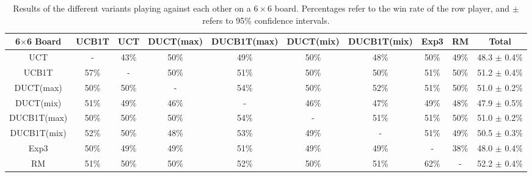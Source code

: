 \documentclass{article}
\begin{document}
\begin{table}[h!]\scriptsize
\centering
\begin{tabular}{|c||c|c|c|c|c|c|c|c||c|}
									\hline
	6$\times$6 Board	& UCB1T 	& UCT		& DUCT(max)	& DUCB1T(max)	& DUCT(mix)	& DUCB1T(mix)	& Exp3 & RM & Total \\ \hline
   UCT &    - & 43\% & 50\% & 49\% & 50\% & 48\% & 50\% & 49\%       & 48.3 $\pm$ 0.4\% \\ \hline 
 UCB1T & 57\% &    - & 50\% & 51\% & 50\% & 50\% & 51\% & 50\%       & 51.2 $\pm$ 0.4\% \\ \hline 
   DUCT(max) & 50\% & 50\% &    - & 54\% & 50\% & 52\% & 51\% & 50\% & 51.0 $\pm$ 0.2\% \\ \hline 
   DUCT(mix) & 51\% & 49\% & 46\% &    - & 46\% & 47\% & 49\% & 48\% & 47.9 $\pm$ 0.5\% \\ \hline 
 DUCB1T(max) & 50\% & 50\% & 50\% & 54\% &    - & 51\% & 51\% & 50\% & 51.0 $\pm$ 0.2\% \\ \hline 
 DUCB1T(mix) & 52\% & 50\% & 48\% & 53\% & 49\% &    - & 51\% & 49\% & 50.5 $\pm$ 0.3\% \\ \hline 
      Exp3 & 50\% & 49\% & 49\% & 51\% & 49\% & 49\% &    - & 38\%   & 48.0 $\pm$ 0.4\% \\ \hline 
        RM & 51\% & 50\% & 50\% & 52\% & 50\% & 51\% & 62\% &    -   & 52.2 $\pm$ 0.4\% \\ \hline 
\end{tabular}
\caption{Results of the different variants playing against each other on a $6\times6$ board. 
Percentages refer to the win rate of the row player, and $\pm$ refers to 95\% confidence intervals.}
\label{table:rr_small}
\end{table}
\end{document}
